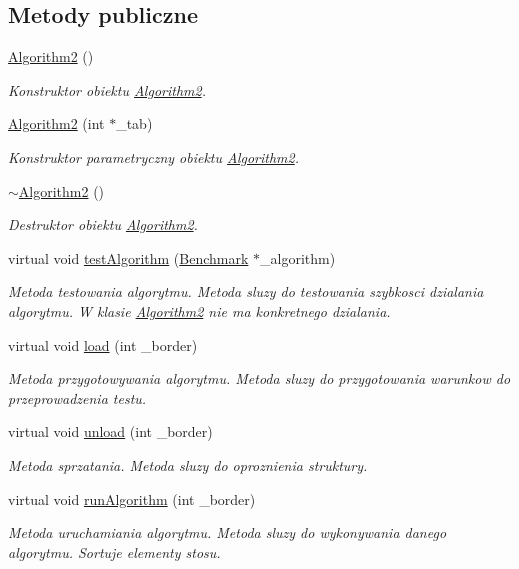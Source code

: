 \subsection*{Metody publiczne}
\begin{DoxyCompactItemize}
\item 
\hyperlink{class_algorithm2_ad77a51433815456eca8139444e78b49b}{Algorithm2} ()
\begin{DoxyCompactList}\small\item\em Konstruktor obiektu \hyperlink{class_algorithm2}{Algorithm2}. \end{DoxyCompactList}\item 
\hyperlink{class_algorithm2_a6623d05c012b2832887a52b693c75583}{Algorithm2} (int $\ast$\-\_\-tab)
\begin{DoxyCompactList}\small\item\em Konstruktor parametryczny obiektu \hyperlink{class_algorithm2}{Algorithm2}. \end{DoxyCompactList}\item 
\hyperlink{class_algorithm2_ab2c630f56f5d2e90f62a13fdaf0cd954}{$\sim$\-Algorithm2} ()
\begin{DoxyCompactList}\small\item\em Destruktor obiektu \hyperlink{class_algorithm2}{Algorithm2}. \end{DoxyCompactList}\item 
virtual void \hyperlink{class_algorithm2_a6eb066d5e51f2187e717454751bc2934}{test\-Algorithm} (\hyperlink{class_benchmark}{Benchmark} $\ast$\-\_\-algorithm)
\begin{DoxyCompactList}\small\item\em Metoda testowania algorytmu. Metoda sluzy do testowania szybkosci dzialania algorytmu. W klasie \hyperlink{class_algorithm2}{Algorithm2} nie ma konkretnego dzialania. \end{DoxyCompactList}\item 
virtual void \hyperlink{class_algorithm2_a50bbb4421660c4200dba66e9da9d7969}{load} (int \-\_\-border)
\begin{DoxyCompactList}\small\item\em Metoda przygotowywania algorytmu. Metoda sluzy do przygotowania warunkow do przeprowadzenia testu. \end{DoxyCompactList}\item 
virtual void \hyperlink{class_algorithm2_a3d7e4d0c9308d0b97250cb5596a73165}{unload} (int \-\_\-border)
\begin{DoxyCompactList}\small\item\em Metoda sprzatania. Metoda sluzy do oproznienia struktury. \end{DoxyCompactList}\item 
virtual void \hyperlink{class_algorithm2_a409e58d5fb0b6d2407cc986cf163703b}{run\-Algorithm} (int \-\_\-border)
\begin{DoxyCompactList}\small\item\em Metoda uruchamiania algorytmu. Metoda sluzy do wykonywania danego algorytmu. Sortuje elementy stosu. \end{DoxyCompactList}\end{DoxyCompactItemize}

